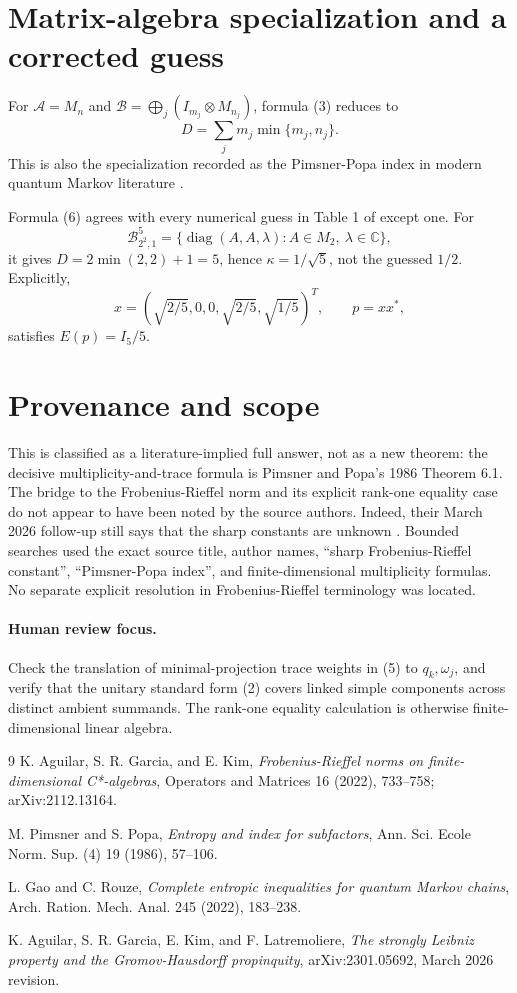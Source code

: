 \documentclass[10pt]{article}
\newcommand{\A}{\mathcal A}
\newcommand{\B}{\mathcal B}
\newcommand{\C}{\mathbb C}
\begin{document}
\section{Matrix-algebra specialization and a corrected guess}

For $\A=M_n$ and
\(
 \B=\bigoplus_j(I_{m_j}\otimes M_{n_j})
\), formula (3) reduces to
\[
                  D=\sum_jm_j\min\{m_j,n_j\}.                 \tag{6}
\]
This is also the specialization recorded as the Pimsner-Popa index in modern
quantum Markov literature \cite[formula (14)]{GR}.

Formula (6) agrees with every numerical guess in Table 1 of \cite{AGK} except
one.  For
\[
 \B^5_{2^2,1}=\{\operatorname{diag}(A,A,\lambda):
                  A\in M_2,\ \lambda\in\C\},
\]
it gives $D=2\min(2,2)+1=5$, hence $\kappa=1/\sqrt5$, not the guessed
$1/2$.  Explicitly,
\[
 x=(\sqrt{2/5},0,0,\sqrt{2/5},\sqrt{1/5})^T,\qquad p=xx^*,
\]
satisfies $E(p)=I_5/5$.

\section{Provenance and scope}

This is classified as a literature-implied full answer, not as a new theorem:
the decisive multiplicity-and-trace formula is Pimsner and Popa's 1986
Theorem 6.1.  The bridge to the Frobenius-Rieffel norm and its explicit
rank-one equality case do not appear to have been noted by the source authors.
Indeed, their March 2026 follow-up still says that the sharp constants are
unknown \cite{AGKL}.  Bounded searches used the exact source title, author
names, ``sharp Frobenius-Rieffel constant'', ``Pimsner-Popa index'', and
finite-dimensional multiplicity formulas.  No separate explicit resolution
in Frobenius-Rieffel terminology was located.

\paragraph{Human review focus.}
Check the translation of minimal-projection trace weights in (5) to
$q_k,\omega_j$, and verify that the unitary standard form (2) covers linked
simple components across distinct ambient summands.  The rank-one equality
calculation is otherwise finite-dimensional linear algebra.

\begin{thebibliography}{9}
K. Aguilar, S. R. Garcia, and E. Kim,
\emph{Frobenius-Rieffel norms on finite-dimensional C*-algebras},
Operators and Matrices 16 (2022), 733--758; arXiv:2112.13164.

M. Pimsner and S. Popa,
\emph{Entropy and index for subfactors},
Ann. Sci. Ecole Norm. Sup. (4) 19 (1986), 57--106.

L. Gao and C. Rouze,
\emph{Complete entropic inequalities for quantum Markov chains},
Arch. Ration. Mech. Anal. 245 (2022), 183--238.

K. Aguilar, S. R. Garcia, E. Kim, and F. Latremoliere,
\emph{The strongly Leibniz property and the Gromov-Hausdorff propinquity},
arXiv:2301.05692, March 2026 revision.
\end{thebibliography}
\end{document}
